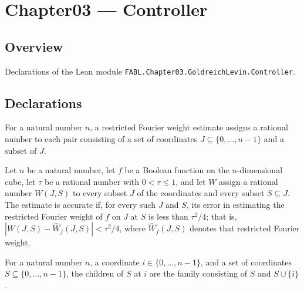\chapter{Chapter03 — Controller}
\section{Overview}

Declarations of the Lean module \texttt{FABL.Chapter03.GoldreichLevin.Controller}.

\section{Declarations}

\begin{definition}
\label{FABL.RestrictedFourierWeightEstimate}
\leanok
For a natural number $n$, a restricted Fourier weight estimate assigns a rational number
to each pair consisting of a set of coordinates $J\subseteq\{0,\ldots,n-1\}$ and a
subset of $J$.
\end{definition}

\begin{definition}
\label{FABL.IsAccurateRestrictedFourierWeightEstimate}
\leanok
{}
Let $n$ be a natural number, let $f$ be a Boolean function on the $n$-dimensional cube,
let $\tau$ be a rational number with $0<\tau\leq1$, and let $W$ assign a rational number
$W(J,S)$ to every subset $J$ of the coordinates and every subset $S\subseteq J$. The
estimate is accurate if, for every such $J$ and $S$, its error in estimating the
restricted Fourier weight of $f$ on $J$ at $S$ is less than $\tau^2/4$; that is,
$|W(J,S)-\widehat W_f(J,S)|<\tau^2/4$, where $\widehat W_f(J,S)$ denotes that restricted
Fourier weight.
\end{definition}

\begin{definition}
\label{FABL.goldreichLevinChildren}
\leanok
For a natural number $n$, a coordinate $i\in\{0,\ldots,n-1\}$, and a set of coordinates
$S\subseteq\{0,\ldots,n-1\}$, the children of $S$ at $i$ are the family consisting of
$S$ and $S\cup\{i\}$.
\end{definition}

